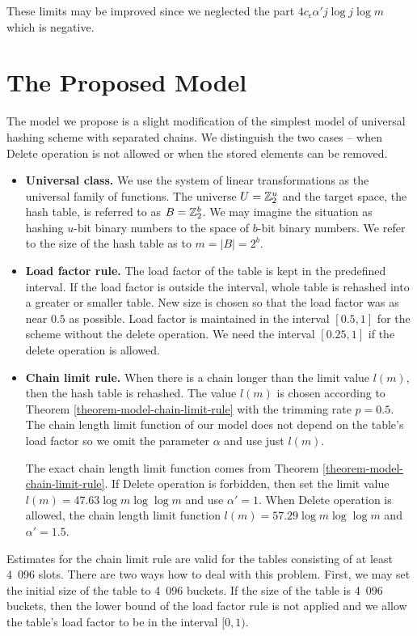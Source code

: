 These limits may be improved since we neglected the part $4 c_\epsilon \alpha' j \log j \log m$ which is negative.

\section{The Proposed Model}
\label{section-proposed-model}
The model we propose is a slight modification of the simplest model of universal hashing scheme with separated chains. We distinguish the two cases -- when Delete operation is not allowed or when the stored elements can be removed.
\begin{itemize}
\item \textbf{Universal class.} We use the system of linear transformations as the universal family of functions. The universe $U = \mathbb{Z}_{2}^{u}$ and the target space, the hash table, is referred to as $B = \mathbb{Z}_{2}^{b}$. We may imagine the situation as hashing $u$-bit binary numbers to the space of $b$-bit binary numbers. We refer to the size of the hash table as to $m = |B| = 2 ^ b$.

\item \textbf{Load factor rule.} The load factor of the table is kept in the predefined interval. If the load factor is outside the interval, whole table is rehashed into a greater or smaller table. New size is chosen so that the load factor was as near $0.5$ as possible. Load factor is maintained in the interval $\left[0.5, 1\right]$ for the scheme without the delete operation. We need the interval $\left[0.25, 1\right]$ if the delete operation is allowed.

\item \textbf{Chain limit rule.} When there is a chain longer than the limit value $l(m)$, then the hash table is rehashed. The value $l(m)$ is chosen according to Theorem \ref{theorem-model-chain-limit-rule} with the trimming rate $p = 0.5$. The chain length limit function of our model does not depend on the table's load factor so we omit the parameter $\alpha$ and use just $l(m)$.

The exact chain length limit function comes from Theorem \ref{theorem-model-chain-limit-rule}. If Delete operation is forbidden, then set the limit value $l(m) = 47.63 \log m \log \log m$ and use $\alpha' = 1$. When Delete operation is allowed, the chain length limit function $l(m) = 57.29 \log m \log \log m$ and $\alpha' = 1.5$.
\end{itemize}

Estimates for the chain limit rule are valid for the tables consisting of at least 4~096 slots. There are two ways how to deal with this problem. First, we may set the initial size of the table to 4~096 buckets. If the size of the table is 4~096 buckets, then the lower bound of the load factor rule is not applied and we allow the table's load factor to be in the interval $[0, 1)$.

